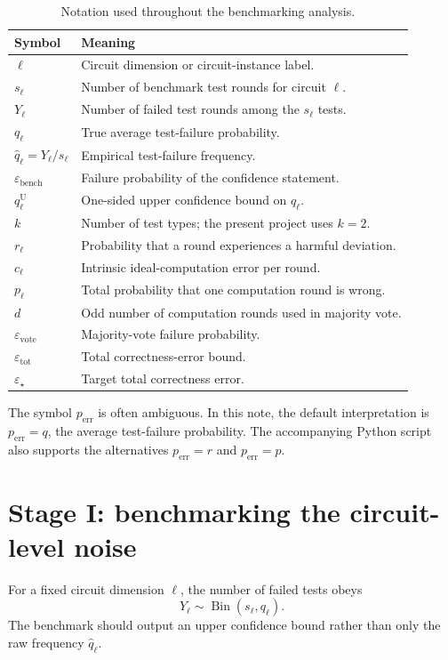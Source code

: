 \documentclass[11pt]{article}
\newcommand{\eps}{\varepsilon}
\newcommand{\Bin}{\operatorname{Bin}}
\begin{document}
\begin{table}[ht]
\centering
\caption{Notation used throughout the benchmarking analysis.}
\begin{tabular}{@{}ll@{}}
\toprule
Symbol & Meaning \\
\midrule
$\ell$ & Circuit dimension or circuit-instance label. \\
$s_\ell$ & Number of benchmark test rounds for circuit $\ell$. \\
$Y_\ell$ & Number of failed test rounds among the $s_\ell$ tests. \\
$q_\ell$ & True average test-failure probability. \\
$\widehat q_\ell=Y_\ell/s_\ell$ & Empirical test-failure frequency. \\
$\eps_{\mathrm{bench}}$ & Failure probability of the confidence statement. \\
$q_\ell^{\mathrm U}$ & One-sided upper confidence bound on $q_\ell$. \\
$k$ & Number of test types; the present project uses $k=2$. \\
$r_\ell$ & Probability that a round experiences a harmful deviation. \\
$c_\ell$ & Intrinsic ideal-computation error per round. \\
$p_\ell$ & Total probability that one computation round is wrong. \\
$d$ & Odd number of computation rounds used in majority vote. \\
$\eps_{\mathrm{vote}}$ & Majority-vote failure probability. \\
$\eps_{\mathrm{tot}}$ & Total correctness-error bound. \\
$\eps_\star$ & Target total correctness error. \\
\bottomrule
\end{tabular}
\end{table}

The symbol $p_{\mathrm{err}}$ is often ambiguous. In this note, the default
interpretation is $p_{\mathrm{err}}=q$, the average test-failure probability.
The accompanying Python script also supports the alternatives
$p_{\mathrm{err}}=r$ and $p_{\mathrm{err}}=p$.

\section{Stage I: benchmarking the circuit-level noise}

For a fixed circuit dimension $\ell$, the number of failed tests obeys
\begin{equation}
  Y_\ell\sim\Bin(s_\ell,q_\ell).
\end{equation}
The benchmark should output an upper confidence bound rather than only the raw
frequency $\widehat q_\ell$.
\end{document}
